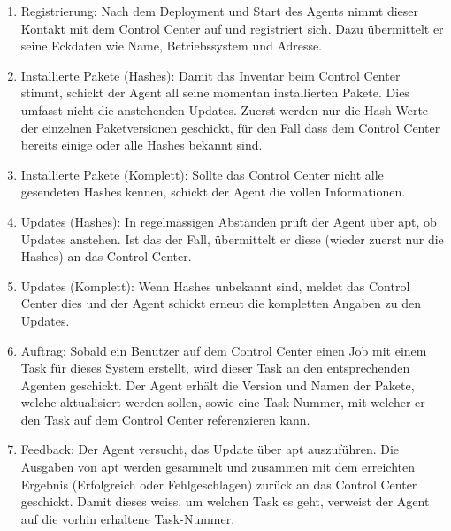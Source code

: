 \begin{enumerate}
    \item Registrierung: Nach dem Deployment und Start des Agents nimmt dieser Kontakt mit dem Control Center auf und registriert sich. Dazu übermittelt er seine Eckdaten wie Name, Betriebssystem und Adresse.
    \item Installierte Pakete (Hashes): Damit das Inventar beim Control Center stimmt, schickt der Agent all seine momentan installierten Pakete. Dies umfasst nicht die anstehenden Updates. Zuerst werden nur die Hash-Werte der einzelnen Paketversionen geschickt, für den Fall dass dem Control Center bereits einige oder alle Hashes bekannt sind.
    \item Installierte Pakete (Komplett): Sollte das Control Center nicht alle gesendeten Hashes kennen, schickt der Agent die vollen Informationen.
    \item Updates (Hashes): In regelmässigen Abständen prüft der Agent über \gls{apt}, ob Updates anstehen. Ist das der Fall, übermittelt er diese (wieder zuerst nur die Hashes) an das Control Center.
    \item Updates (Komplett): Wenn Hashes unbekannt sind, meldet das Control Center dies und der Agent schickt erneut die kompletten Angaben zu den Updates.
    \item Auftrag: Sobald ein Benutzer auf dem Control Center einen Job mit einem Task für dieses System erstellt, wird dieser Task an den entsprechenden Agenten geschickt. Der Agent erhält die Version und Namen der Pakete, welche aktualisiert werden sollen, sowie eine Task-Nummer, mit welcher er den Task auf dem Control Center referenzieren kann.
    \item Feedback: Der Agent versucht, das Update über \gls{apt} auszuführen. Die Ausgaben von apt werden gesammelt und zusammen mit dem erreichten Ergebnis (Erfolgreich oder Fehlgeschlagen) zurück an das Control Center geschickt. Damit dieses weiss, um welchen Task es geht, verweist der Agent auf die vorhin erhaltene Task-Nummer.
\end{enumerate}

